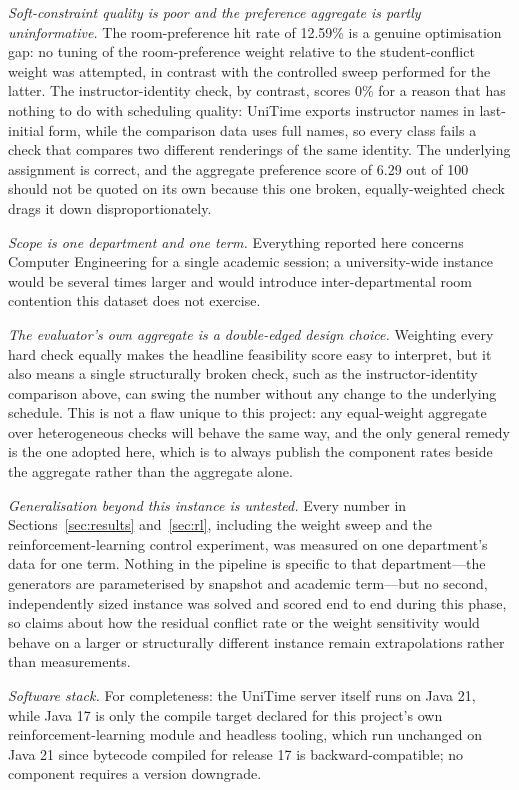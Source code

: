 \documentclass[journal]{IEEEtran}
\begin{document}
\emph{Soft-constraint quality is poor and the preference aggregate is partly uninformative.} The room-preference hit rate of 12.59\% is a genuine optimisation gap: no tuning of the room-preference weight relative to the student-conflict weight was attempted, in contrast with the controlled sweep performed for the latter. The instructor-identity check, by contrast, scores 0\% for a reason that has nothing to do with scheduling quality: UniTime exports instructor names in last-initial form, while the comparison data uses full names, so every class fails a check that compares two different renderings of the same identity. The underlying assignment is correct, and the aggregate preference score of 6.29 out of 100 should not be quoted on its own because this one broken, equally-weighted check drags it down disproportionately.

\emph{Scope is one department and one term.} Everything reported here concerns Computer Engineering for a single academic session; a university-wide instance would be several times larger and would introduce inter-departmental room contention this dataset does not exercise.

\emph{The evaluator's own aggregate is a double-edged design choice.} Weighting every hard check equally makes the headline feasibility score easy to interpret, but it also means a single structurally broken check, such as the instructor-identity comparison above, can swing the number without any change to the underlying schedule. This is not a flaw unique to this project: any equal-weight aggregate over heterogeneous checks will behave the same way, and the only general remedy is the one adopted here, which is to always publish the component rates beside the aggregate rather than the aggregate alone.

\emph{Generalisation beyond this instance is untested.} Every number in Sections~\ref{sec:results} and~\ref{sec:rl}, including the weight sweep and the reinforcement-learning control experiment, was measured on one department's data for one term. Nothing in the pipeline is specific to that department---the generators are parameterised by snapshot and academic term---but no second, independently sized instance was solved and scored end to end during this phase, so claims about how the residual conflict rate or the weight sensitivity would behave on a larger or structurally different instance remain extrapolations rather than measurements.

\emph{Software stack.} For completeness: the UniTime server itself runs on Java 21, while Java 17 is only the compile target declared for this project's own reinforcement-learning module and headless tooling, which run unchanged on Java 21 since bytecode compiled for release 17 is backward-compatible; no component requires a version downgrade.
\end{document}
